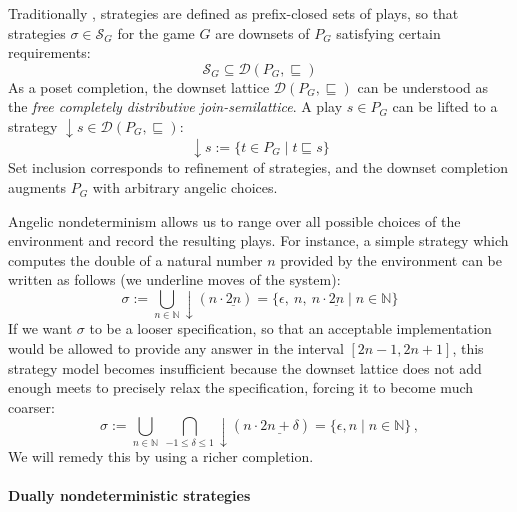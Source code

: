 \documentclass[sigplan,screen]{acmart}
\begin{document}
Traditionally \cite{gamesem99},
strategies are defined as
prefix-closed sets of plays,
so that strategies $\sigma \in \mathcal{S}_G$
for the game $G$ are downsets of $P_G$
satisfying certain requirements:
\[
    \mathcal{S}_G \subseteq
    \mathcal{D}(P_G, {\sqsubseteq})
\]
%
As a poset completion,
the downset lattice
$\mathcal{D}(P_G, {\sqsubseteq})$
can be understood as
the \emph{free completely distributive join-semilattice}.
A play $s \in P_G$ can be lifted to a strategy
${\downarrow} s \in \mathcal{D}(P_G, {\sqsubseteq})$:
\[
    {\downarrow} s := \{ t \in P_G \mid t \sqsubseteq s \}
\]
Set inclusion corresponds to refinement of strategies,
and the downset completion augments $P_G$ with
arbitrary angelic choices.

Angelic nondeterminism
allows us to range over all possible choices of the environment
and record the resulting plays.
For instance,
a simple strategy which computes
the double of a natural number $n$
provided by the environment
can be written as follows
(we underline moves of the system):
\[
  \sigma :=
    \bigcup_{n \in \mathbb{N}} {\downarrow}(n \cdot \underline{2n}) =
    \{ \epsilon, \: n, \: n \cdot \underline{2n} \mid n \in \mathbb{N} \}
\]
If we want $\sigma$ to be a looser specification,
so that an acceptable implementation
would be allowed to provide any answer in the interval
$[2n - 1, 2n + 1]$,
this strategy model becomes insufficient
because the downset lattice does not add enough meets
to precisely relax the specification,
forcing it to become
much coarser:
\[
  \sigma :=
    \bigcup_{n \in \mathbb{N}} \:
    \bigcap_{-1 \le \delta \le 1}
    {\downarrow}(n \cdot \underline{2n+\delta}) =
    \{ \epsilon, n \mid n \in \mathbb{N} \} \,,
\]
We will remedy this by using a richer completion.


\paragraph{Dually nondeterministic strategies} %
\end{document}
